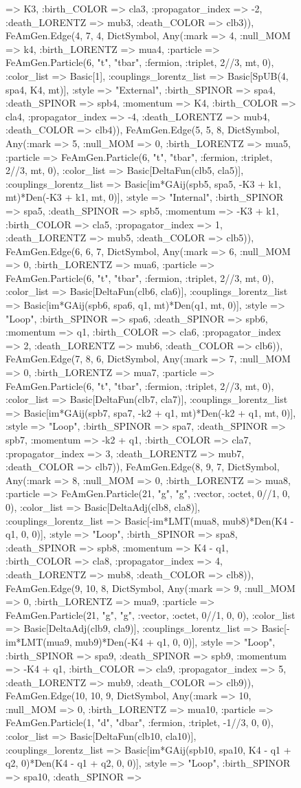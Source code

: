 \documentclass{revtex4}
\begin{document}
\begin{figure}[!htb]
\begin{center}
{=> K3, :birth_COLOR => cla3, :propagator_index => -2, :death_LORENTZ => mub3, :death_COLOR => clb3)), FeAmGen.Edge(4, 7, 4, Dict{Symbol, Any}(:mark => 4, :null_MOM => k4, :birth_LORENTZ => mua4, :particle => FeAmGen.Particle(6, "t", "tbar", :fermion, :triplet, 2//3, mt, 0), :color_list => Basic[1], :couplings_lorentz_list => Basic[SpUB(4, spa4, K4, mt)], :style => "External", :birth_SPINOR => spa4, :death_SPINOR => spb4, :momentum => K4, :birth_COLOR => cla4, :propagator_index => -4, :death_LORENTZ => mub4, :death_COLOR => clb4)), FeAmGen.Edge(5, 5, 8, Dict{Symbol, Any}(:mark => 5, :null_MOM => 0, :birth_LORENTZ => mua5, :particle => FeAmGen.Particle(6, "t", "tbar", :fermion, :triplet, 2//3, mt, 0), :color_list => Basic[DeltaFun(clb5, cla5)], :couplings_lorentz_list => Basic[im*GAij(spb5, spa5, -K3 + k1, mt)*Den(-K3 + k1, mt, 0)], :style => "Internal", :birth_SPINOR => spa5, :death_SPINOR => spb5, :momentum => -K3 + k1, :birth_COLOR => cla5, :propagator_index => 1, :death_LORENTZ => mub5, :death_COLOR => clb5)), FeAmGen.Edge(6, 6, 7, Dict{Symbol, Any}(:mark => 6, :null_MOM => 0, :birth_LORENTZ => mua6, :particle => FeAmGen.Particle(6, "t", "tbar", :fermion, :triplet, 2//3, mt, 0), :color_list => Basic[DeltaFun(clb6, cla6)], :couplings_lorentz_list => Basic[im*GAij(spb6, spa6, q1, mt)*Den(q1, mt, 0)], :style => "Loop", :birth_SPINOR => spa6, :death_SPINOR => spb6, :momentum => q1, :birth_COLOR => cla6, :propagator_index => 2, :death_LORENTZ => mub6, :death_COLOR => clb6)), FeAmGen.Edge(7, 8, 6, Dict{Symbol, Any}(:mark => 7, :null_MOM => 0, :birth_LORENTZ => mua7, :particle => FeAmGen.Particle(6, "t", "tbar", :fermion, :triplet, 2//3, mt, 0), :color_list => Basic[DeltaFun(clb7, cla7)], :couplings_lorentz_list => Basic[im*GAij(spb7, spa7, -k2 + q1, mt)*Den(-k2 + q1, mt, 0)], :style => "Loop", :birth_SPINOR => spa7, :death_SPINOR => spb7, :momentum => -k2 + q1, :birth_COLOR => cla7, :propagator_index => 3, :death_LORENTZ => mub7, :death_COLOR => clb7)), FeAmGen.Edge(8, 9, 7, Dict{Symbol, Any}(:mark => 8, :null_MOM => 0, :birth_LORENTZ => mua8, :particle => FeAmGen.Particle(21, "g", "g", :vector, :octet, 0//1, 0, 0), :color_list => Basic[DeltaAdj(clb8, cla8)], :couplings_lorentz_list => Basic[-im*LMT(mua8, mub8)*Den(K4 - q1, 0, 0)], :style => "Loop", :birth_SPINOR => spa8, :death_SPINOR => spb8, :momentum => K4 - q1, :birth_COLOR => cla8, :propagator_index => 4, :death_LORENTZ => mub8, :death_COLOR => clb8)), FeAmGen.Edge(9, 10, 8, Dict{Symbol, Any}(:mark => 9, :null_MOM => 0, :birth_LORENTZ => mua9, :particle => FeAmGen.Particle(21, "g", "g", :vector, :octet, 0//1, 0, 0), :color_list => Basic[DeltaAdj(clb9, cla9)], :couplings_lorentz_list => Basic[-im*LMT(mua9, mub9)*Den(-K4 + q1, 0, 0)], :style => "Loop", :birth_SPINOR => spa9, :death_SPINOR => spb9, :momentum => -K4 + q1, :birth_COLOR => cla9, :propagator_index => 5, :death_LORENTZ => mub9, :death_COLOR => clb9)), FeAmGen.Edge(10, 10, 9, Dict{Symbol, Any}(:mark => 10, :null_MOM => 0, :birth_LORENTZ => mua10, :particle => FeAmGen.Particle(1, "d", "dbar", :fermion, :triplet, -1//3, 0, 0), :color_list => Basic[DeltaFun(clb10, cla10)], :couplings_lorentz_list => Basic[im*GAij(spb10, spa10, K4 - q1 + q2, 0)*Den(K4 - q1 + q2, 0, 0)], :style => "Loop", :birth_SPINOR => spa10, :death_SPINOR => }
\end{center}
\end{figure}
\end{document}
